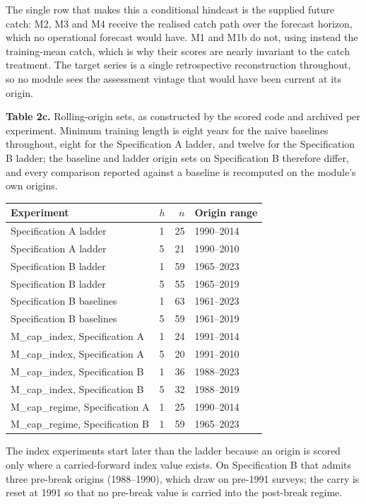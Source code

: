\documentclass[11pt]{article}
\begin{document}
The single row that makes this a conditional hindcast is the supplied
future catch: M2, M3 and M4 receive the realised catch path over the
forecast horizon, which no operational forecast would have. M1 and M1b
do not, using instead the training-mean catch, which is why their scores
are nearly invariant to the catch treatment. The target series is a
single retrospective reconstruction throughout, so no module sees the
assessment vintage that would have been current at its origin.

\textbf{Table 2c.} Rolling-origin sets, as constructed by the scored
code and archived per experiment. Minimum training length is eight years
for the naive baselines throughout, eight for the Specification A
ladder, and twelve for the Specification B ladder; the baseline and
ladder origin sets on Specification B therefore differ, and every
comparison reported against a baseline is recomputed on the module's own
origins.

\begin{longtable}[]{@{}llrl@{}}
\toprule\noalign{}
Experiment & \(h\) & \(n\) & Origin range \\
\midrule\noalign{}
\endhead
\bottomrule\noalign{}
\endlastfoot
Specification A ladder & 1 & 25 & 1990--2014 \\
Specification A ladder & 5 & 21 & 1990--2010 \\
Specification B ladder & 1 & 59 & 1965--2023 \\
Specification B ladder & 5 & 55 & 1965--2019 \\
Specification B baselines & 1 & 63 & 1961--2023 \\
Specification B baselines & 5 & 59 & 1961--2019 \\
M\_cap\_index, Specification A & 1 & 24 & 1991--2014 \\
M\_cap\_index, Specification A & 5 & 20 & 1991--2010 \\
M\_cap\_index, Specification B & 1 & 36 & 1988--2023 \\
M\_cap\_index, Specification B & 5 & 32 & 1988--2019 \\
M\_cap\_regime, Specification A & 1 & 25 & 1990--2014 \\
M\_cap\_regime, Specification B & 1 & 59 & 1965--2023 \\
\end{longtable}

The index experiments start later than the ladder because an origin is
scored only where a carried-forward index value exists. On Specification
B that admits three pre-break origins (1988--1990), which draw on
pre-1991 surveys; the carry is reset at 1991 so that no pre-break value
is carried into the post-break regime.
\end{document}
